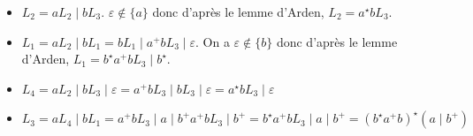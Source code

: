 \begin{corrections}
\begin{questions}
    \begin{itemize}
    \item $L_2 = a L_2 \mid b L_3$.  $\varepsilon\notin\{a\}$ donc d'après le lemme d'Arden, $L_2 = a^\star b L_3$.
    \item $L_1 = a L_2 \mid b L_1 = b L_1 \mid a^+ b L_3 \mid\varepsilon$. On a $\varepsilon\notin\{b\}$ donc d'après le lemme d'Arden, $L_1 = b^\star a^+ b L_3 \mid b^\star$.
    \item $L_4 = a L_2 \mid b L_3 \mid\varepsilon = a^+ b L_3 \mid b L_3 \mid\varepsilon = a^\star b L_3 \mid \varepsilon$
    \item $L_3 = a L_4 \mid b L_1 = a^+ b L_3 \mid a \mid b^+ a^+ b L_3 \mid b^+ = b^\star a^+ b L_3 \mid a \mid b^+  = (b^\star a^+ b)^\star (a \mid b^+)$
    \end{itemize}

  \end{questions}

\end{corrections}

\endgroup
\endinput
